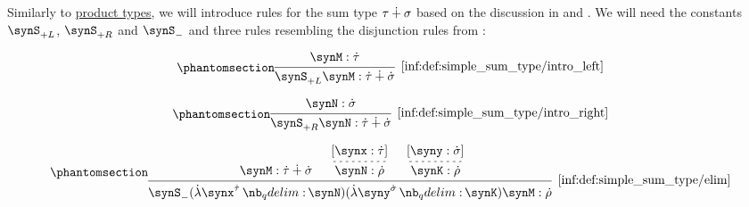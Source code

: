 \begin{definition}\label{def:simple_sum_type}\mimprovised
  Similarly to \hyperref[def:simple_product_type]{product types}, we will introduce rules for the sum type \( \tau \mathbin{\dotplus} \sigma \) based on the discussion in  and . We will need the constants \( \synS_{+L} \), \( \synS_{+R} \) and \( \synS_- \) and three rules resembling the disjunction rules from :
  \begin{paracol}{3}
    \begin{nthcolumn}{0}
      \ParacolAlignmentHack
      \begin{equation*}\taglabel[\ensuremath{ +_{+L} }]{inf:def:simple_sum_type/intro_left}
        \begin{prooftree}
          \hypo{ \synM: \syn\tau }
          \infer1[\ref{inf:def:simple_sum_type/intro_left}]{ \synS_{+L} \synM: \syn\tau \synplus \syn\sigma }
        \end{prooftree}
      \end{equation*}
    \end{nthcolumn}

    \begin{nthcolumn}{1}
      \ParacolAlignmentHack
      \begin{equation*}\taglabel[\ensuremath{ +_{+R} }]{inf:def:simple_sum_type/intro_right}
        \begin{prooftree}
          \hypo{ \synN: \syn\sigma }
          \infer1[\ref{inf:def:simple_sum_type/intro_right}]{ \synS_{+R} \synN: \syn\tau \synplus \syn\sigma }
        \end{prooftree}
      \end{equation*}
    \end{nthcolumn}

    \begin{nthcolumn}{2}
      \ParacolAlignmentHack
      \begin{equation*}\taglabel[\ensuremath{ +_- }]{inf:def:simple_sum_type/elim}
        \begin{prooftree}
          \hypo{ \synM: \syn\tau \synplus \syn\sigma }
          \hypo{ [\synx: \syn\tau] }
          \infer[dashed]1{ \synN: \syn\rho }
          \hypo{ [\syny: \syn\sigma] }
          \infer[dashed]1{ \synK: \syn\rho }
          \infer3[\ref{inf:def:simple_sum_type/elim}]{ \synS_- (\qabs {\synx^{\syn\tau}} \synN) (\qabs {\syny^{\syn\sigma}} \synK) \synM: \syn\rho }
        \end{prooftree}
      \end{equation*}
    \end{nthcolumn}
  \end{paracol}
  \columnratio{}
\end{definition}
